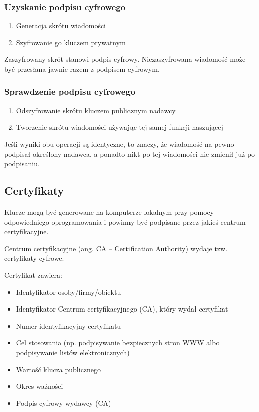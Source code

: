 \documentclass[12pt]{article}
\begin{document}
    \subsubsection{Uzyskanie podpisu cyfrowego}
    \begin{enumerate}
        \item Generacja skrótu wiadomości
        \item Szyfrowanie go kluczem prywatnym
    \end{enumerate}

    Zaszyfrowany skrót stanowi podpis cyfrowy.
    Niezaszyfrowana wiadomość może być przesłana jawnie razem z podpisem cyfrowym.

    \subsubsection{Sprawdzenie podpisu cyfrowego}
    \begin{enumerate}
        \item Odszyfrowanie skrótu kluczem publicznym nadawcy
        \item Tworzenie skrótu wiadomości używając tej samej funkcji haszującej
    \end{enumerate}

        Jeśli wyniki obu operacji są identyczne, to znaczy, że wiadomość na pewno
        podpisał określony nadawca, a ponadto nikt po tej wiadomości nie zmienił już po podpisaniu.



    \subsection{Certyfikaty}

    Klucze mogą być generowane na komputerze lokalnym przy pomocy odpowiedniego oprogramowania i powinny być podpisane przez jakieś centrum certyfikacyjne.

    Centrum certyfikacyjne (ang. CA – Certification Authority) wydaje tzw. certyfikaty cyfrowe.

    Certyfikat zawiera:
    \begin{itemize}
        \item Identyfikator osoby/firmy/obiektu
        \item Identyfikator Centrum certyfikacyjnego (CA), który wydał certyfikat
        \item Numer identyfikacyjny certyfikatu
        \item Cel stosowania (np. podpisywanie bezpiecznych stron WWW albo podpisywanie listów elektronicznych)
        \item Wartość klucza publicznego
        \item Okres ważności
        \item Podpis cyfrowy wydawcy (CA)
    \end{itemize}
\end{document}
